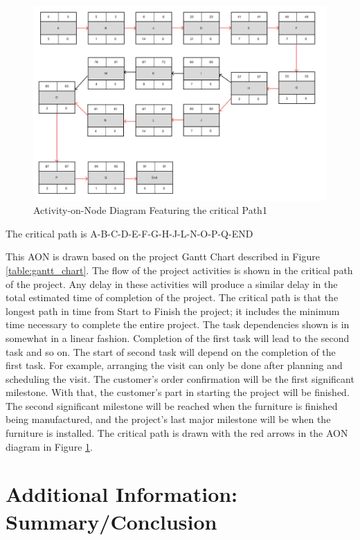 \begin{figure}[!h]
    \centering
    \includegraphics[scale=0.3]{AoN.png}
    \caption{Activity-on-Node Diagram Featuring the critical Path1}
    \label{figure:aon}
\end{figure}

The critical path is A-B-C-D-E-F-G-H-J-L-N-O-P-Q-END


This AON is drawn based on the project Gantt Chart described in Figure \ref{table:gantt_chart}.
The flow of the project activities is shown in the critical path of the project. Any
delay in these activities will produce a similar delay in the total estimated time of
completion of the project. The critical path is that the longest path in time from Start to
Finish the project; it includes the minimum time necessary to complete the entire
project. The task dependencies shown is in somewhat in a linear fashion. Completion
of the first task will lead to the second task and so on. The start of second task will
depend on the completion of the first task. For example, arranging the visit can only be done
after planning and scheduling the visit. The customer's order confirmation will be the first
significant milestone. With that, the customer's part in starting the project will be
finished. The second significant milestone will be reached when the furniture is finished
being manufactured, and the project's last major milestone will be when the furniture is
installed. The critical path is drawn with the red arrows
in the AON diagram in Figure \ref{figure:aon}.
\section{Additional Information: Summary/Conclusion}
